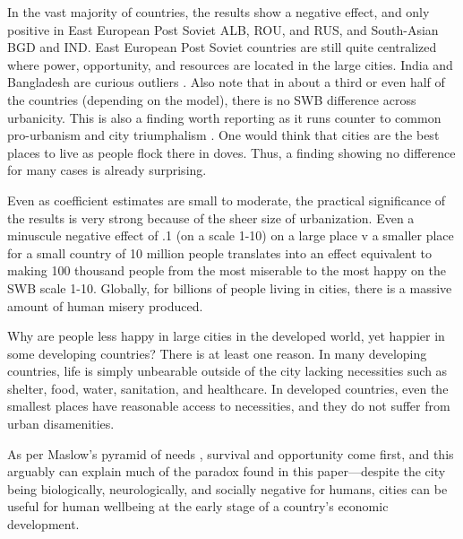\documentclass[10pt, letterpaper]{article}
\begin{document}
In the vast majority of countries, the results show a negative effect, and only
positive in East European Post Soviet ALB, ROU, and RUS, and South-Asian BGD and IND.
East European Post Soviet countries are still quite centralized where power, opportunity, and resources are located in the large cities. %
India and Bangladesh are curious outliers \citep[for some discussion see][]{deb2020exploring}.
Also note that in about a third or even half of the countries (depending on the
model), there is no SWB difference across urbanicity. This is also a finding
worth reporting as it runs counter to common pro-urbanism and city triumphalism
\citep[e.g.,][]{glaeser11}.
%
One would think that cities are the best places to live as people flock there in doves.
Thus, a finding showing no difference for many cases is already surprising.

Even as coefficient estimates are small to moderate, the practical significance
of the results is very strong because of the sheer size of urbanization. 
%
Even a minuscule negative effect of .1 (on a scale 1-10) on a large place v a smaller place for a small country of 10 million people translates into an effect equivalent to making 100 thousand people from the most miserable to the most happy on the SWB scale 1-10. %
 Globally, for billions of people living in cities, there is a massive amount of
 human misery produced. 

Why are people less happy in large cities in the developed world, yet happier in some
developing countries? There is at least one reason. In many developing countries, life is simply unbearable outside of the city lacking necessities such as shelter, food, water, sanitation, and healthcare. In developed countries, even the smallest places have reasonable access to necessities, and they do not suffer from urban disamenities. %
 
As per Maslow's pyramid of needs \citep{maslow87}, survival and opportunity
come first, and this arguably can explain much of the paradox found in this
paper---despite the city being biologically, neurologically, and socially negative
for humans, cities can be useful for human wellbeing at the early stage of a
country's economic development. 
\end{document}

